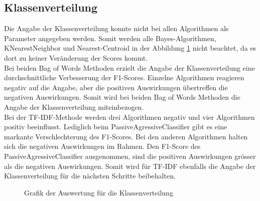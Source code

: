 \subsection{Klassenverteilung}
Die Angabe der Klassenverteilung konnte nicht bei allen Algorithmen als Parameter angegeben werden.
Somit werden alle Bayes-Algorithmen, KNearestNeighbor und Nearest-Centroid in der Abbildung \cref{abb:classweight} nicht beachtet, da es dort zu keiner Veränderung der Scores kommt.\\
Bei beiden \glqq Bag of Words\grqq{} Methoden erzielt die Angabe der Klassenverteilung eine durchschnittliche Verbesserung der F1-Scores.
Einzelne Algorithmen reagieren negativ auf die Angabe, aber die positiven Auswirkungen übertreffen die negativen Auswirkungen.
Somit wird bei beiden \glqq Bag of Words\grqq{} Methoden die Angabe der Klassenverteilung miteinbezogen.\\
Bei der TF-IDF-Methode werden drei Algorithmen negativ und vier Algorithmen positiv beeinflusst.
Lediglich beim PassiveAgressiveClassifier gibt es eine markante Verschlechterung des F1-Scores.
Bei den anderen Algorithmen halten sich die negativen Auswirkungen im Rahmen.
Den F1-Score des PassiveAgressiveClassifier ausgenommen, sind die positiven Auswirkungen grösser als die negativen Auswirkungen.
Somit wird für TF-IDF ebenfalls die Angabe der Klassenverteilung für die nächsten Schritte beibehalten.
\begin{figure}[H]	
	\setlength{\fboxsep}{0.3pt} 
	\setlength{\fboxrule}{0.3pt} 
	\caption{Grafik der Auswertung für die Klassenverteilung}
	\label{abb:classweight}
\end{figure}
